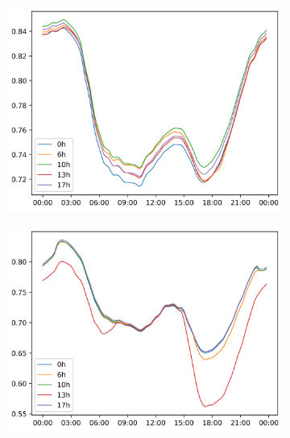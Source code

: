 \begin{figure}[H]
    \begin{subfigure}{.5\textwidth}
        \centering
        \includegraphics[width=\linewidth]{img/switchstate_exploring/suburb2/switchstates_over_time.png}
        \caption{}
        \label{fig:time:suburb2:best_at_different_times}
    \end{subfigure}%
    \begin{subfigure}{.5\textwidth}
        \centering
        \includegraphics[width=\linewidth]{img/switchstate_exploring/urban2/switchstates_over_time.png}
        \caption{}
        \label{fig:time:urban2:best_at_different_times}
    \end{subfigure}
    \caption{}
    \label{fig:time:best_at_different_times}
\end{figure}